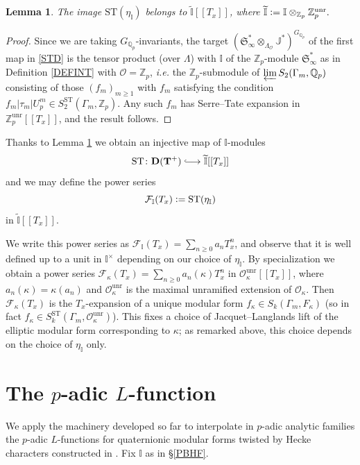 \documentclass[a4paper,11pt]{amsart}
\numberwithin{equation}{section}
\theoremstyle{plain}
\newtheorem{lemma}[theorem]{Lemma}
\theoremstyle{definition}
\theoremstyle{remark}
\newcommand{\Q}{\mathbb{Q}}
\newcommand{\Z}{\mathbb{Z}}
\newcommand{\I}{\mathbb{I}}
\newcommand{\J}{\mathbb{J}}
\newcommand{\defeq}{\vcentcolon=}
\newcommand{\unr}{\mathrm{unr}}
\newcommand{\ST}{\mathrm{ST}}
\newcommand{\longmono}{\mbox{\;$\lhook\joinrel\longrightarrow$\;}}
\newcommand{\invlim}{\mathop{\varprojlim}\limits}
\begin{document}
{{\begin{lemma}\label{lemmaI}
The image $\ST(\eta_\I)$ belongs to $\widetilde{\I}[[T_x]]$, where $\widetilde{\I}\defeq\I\otimes_{\Z_p}\Z_p^\unr.$
\end{lemma}

\begin{proof}
  Since we are taking $G_{\Q_p}$-invariants, the target $(\mathfrak{S}_\infty^*\otimes_{\Lambda_\mathcal{O}}\J^*)^{G_{\Q_p}}$ of the first map 
  in \eqref{STD} is the tensor product (over $\Lambda$) with $\I$ of the 
  $\Z_p$-module $\mathfrak{S}_\infty^*$ as in Definition \ref{DEFINT} with $\mathcal{O}=\Z_p$, 
  \emph{i.e.} the $\Z_p$-submodule of
    $\invlim S_2(\Gamma_m,\Q_p)$ consisting of those $(f_m)_{m\geq 1}$ with $f_m$ 
    satisfying the condition $f_m|\tau_m| U_p^m\in S_2^\ST(\Gamma_m,\Z_p)$. Any such $f_m$ has Serre--Tate expansion in $\Z_p^\unr[[T_x]]$, and the result follows.  
\end{proof}

Thanks to Lemma \ref{lemmaI} we obtain an injective map of $\I$-modules   
\[\ST\colon\mathbf{D}(\mathbf{T}^+)\longmono \widetilde{\I}[[T_x]]\] 
and we may define the power series 
\begin{equation}\label{FIT}\mathcal{F}_\I(T_x)\defeq\ST(\eta_\I)\end{equation} in $\widetilde{\I}[[T_x]]$.}
We write this power series as $\mathcal{F}_\I(T_x)=\sum_{n\geq 0}a_nT_x^n$, and observe that it is well defined up to a unit in $\I^\times$ depending on our choice of $\eta_\I$. 
By specialization we obtain a power series $\mathcal{F}_\kappa(T_x)= \sum_{n\geq 0}a_n(\kappa)T_x^n$ in $\mathcal{O}_\kappa^\unr[[T_x]]$, where  $a_n(\kappa)=\kappa(a_n)$ and $\mathcal{O}_\kappa^\unr$ is the maximal unramified extension of $\mathcal{O}_\kappa$. 
Then $\mathcal{F}_\kappa(T_x)$ is the $T_x$-expansion of a unique modular form $f_\kappa\in S_k(\Gamma_m,F_\kappa)$ 
(so in fact $f_\kappa\in S^\ST_k(\Gamma_m,\mathcal{O}^\unr_\kappa)$). 
This fixes a choice of Jacquet--Langlands lift of the elliptic modular form corresponding to $\kappa$; as remarked above, this choice depends on the choice of $\eta_\I$ only.

\section{The $p$-adic $L$-function} \label{sec.padicLfunction}
We apply the machinery developed so far to interpolate in $p$-adic analytic families the $p$-adic $L$-functions for quaternionic modular forms twisted by Hecke characters constructed in \cite{Magrone, Mori1, Brooks}.
Fix $\I$ as in \S\ref{PBHF}. 

}
\end{document}
